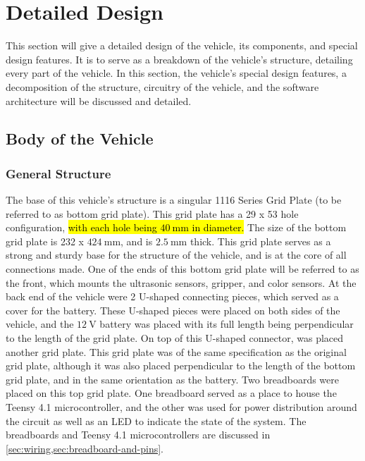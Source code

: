 \documentclass[11pt]{report}
\begin{document}
\chapter{Detailed Design}\label{ch:detailed-design}
This section will give a detailed design of the vehicle, its components, and special design features. It is to serve as a breakdown of the vehicle's structure, detailing every part of the vehicle. In this section, the vehicle's special design features, a decomposition of the structure, circuitry of the vehicle, and the software architecture will be discussed and detailed. 

\section{Body of the Vehicle}
\subsection{General Structure}
The base of this vehicle's structure is a singular 1116 Series Grid Plate (to be referred to as bottom grid plate). This grid plate has a  29 x 53 hole configuration, \hl{with each hole being $\SI{40}{\milli\meter}$ in diameter.} The size of the bottom grid plate is 232 x $\SI{424}{\milli\meter}$, and is $\SI{2.5}{\milli\meter}$ thick. This grid plate serves as a strong and sturdy base for the structure of the vehicle, and is at the core of all connections made. One of the ends of this bottom grid plate will be referred to as the front, which mounts the ultrasonic sensors, gripper, and color sensors. At the back end of the vehicle were 2 U-shaped connecting pieces, which served as a cover for the battery. These U-shaped pieces were placed on both sides of the vehicle, and the $\SI{12}{\volt}$ battery was placed with its full length being perpendicular to the length of the grid plate. On top of this U-shaped connector, was placed another grid plate. This grid plate was of the same specification as the original grid plate, although it was also placed perpendicular to the length of the bottom grid plate, and in the same orientation as the battery. Two breadboards were placed on this top grid plate. One breadboard served as a place to house the Teensy 4.1 microcontroller, and the other was used for power distribution around the circuit as well as an \gls{LED} to indicate the state of the system. The breadboards and Teensy 4.1 microcontrollers are discussed in \cref{sec:wiring,sec:breadboard-and-pins}.
\end{document}
